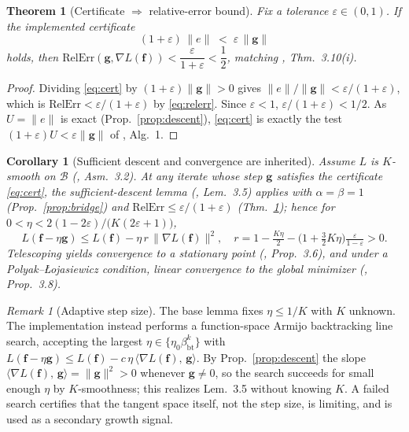 \documentclass[conference]{IEEEtran}
\newtheorem{theorem}{Theorem}
\newtheorem{corollary}{Corollary}
\theoremstyle{remark}
\newtheorem{remark}{Remark}
\newcommand{\inner}[2]{\langle #1,\, #2\rangle}
\newcommand{\norm}[1]{\lVert #1\rVert}
\newcommand{\grad}{\nabla}
\newcommand{\eps}{\varepsilon}
\newcommand{\f}{\bm{f}}
\newcommand{\g}{\bm{g}}
\newcommand{\rerr}{\mathrm{RelErr}}
\begin{document}
\begin{theorem}[Certificate $\Rightarrow$ relative-error bound]\label{thm:cert}
Fix a tolerance $\eps\in(0,1)$. If the implemented certificate
\begin{equation}\label{eq:cert}
(1+\eps)\,\norm{e}\;<\;\eps\,\norm{\g}
\end{equation}
holds, then $\rerr(\g,\grad L(\f))<\dfrac{\eps}{1+\eps}<\dfrac12$, matching
\cite{fgd}, Thm.~3.10(i).
\end{theorem}
\begin{proof}
Dividing \eqref{eq:cert} by $(1+\eps)\norm{\g}>0$ gives
$\norm{e}/\norm{\g}<\eps/(1+\eps)$, which is $\rerr<\eps/(1+\eps)$ by
\eqref{eq:relerr}. Since $\eps<1$, $\eps/(1+\eps)<1/2$. As $U=\norm{e}$ is exact
(Prop.~\ref{prop:descent}), \eqref{eq:cert} is exactly the test
$(1+\eps)U<\eps\norm{\g}$ of \cite{fgd}, Alg.~1.
\end{proof}

\begin{corollary}[Sufficient descent and convergence are inherited]\label{cor:descent}
Assume $L$ is $K$-smooth on $\mathcal B$ (\cite{fgd}, Asm.~3.2). At any iterate
whose step $\g$ satisfies the certificate \eqref{eq:cert}, the sufficient-descent
lemma (\cite{fgd}, Lem.~3.5) applies with $\alpha=\beta=1$
(Prop.~\ref{prop:bridge}) and $\rerr\le\eps/(1+\eps)$
(Thm.~\ref{thm:cert}); hence for $0<\eta<2(1-2\eps)/\big(K(2\eps+1)\big)$,
\begin{equation}
L(\f-\eta\g)\le L(\f)-\eta\,r\,\norm{\grad L(\f)}^2,\quad
r=1-\tfrac{K\eta}{2}-\big(1+\tfrac32 K\eta\big)\tfrac{\eps}{1-\eps}>0 .
\end{equation}
Telescoping yields convergence to a stationary point (\cite{fgd}, Prop.~3.6), and
under a Polyak--{\L}ojasiewicz condition, linear convergence to the global
minimizer (\cite{fgd}, Prop.~3.8).
\end{corollary}

\begin{remark}[Adaptive step size]
The base lemma fixes $\eta\le 1/K$ with $K$ unknown. The implementation instead
performs a function-space Armijo backtracking line search, accepting the largest
$\eta\in\{\eta_0\beta_{\mathrm{bt}}^k\}$ with
$L(\f-\eta\g)\le L(\f)-c\,\eta\,\inner{\grad L(\f)}{\g}$. By
Prop.~\ref{prop:descent} the slope $\inner{\grad L(\f)}{\g}=\norm{\g}^2>0$ whenever
$\g\neq0$, so the search succeeds for small enough $\eta$ by $K$-smoothness; this
realizes Lem.~3.5 without knowing $K$. A failed search certifies that the tangent
space itself, not the step size, is limiting, and is used as a secondary growth
signal.
\end{remark}
\end{document}
